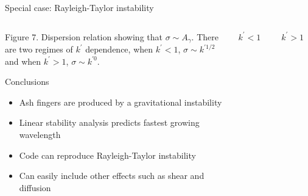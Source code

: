 \documentclass[final]{beamer} %
\begin{document}
\begin{frame}[t]
\begin{block}{Special case: Rayleigh-Taylor instability}
\begin{columns}[t]
\begin{column}{0.3\paperwidth}
        \vspace{-0.8cm}

        \centering \footnotesize Figure 7. Dispersion relation showing that $\sigma \sim A_{\gamma}$. There are two regimes of $k^{\prime}$ dependence, when $k^{\prime} < 1$, $\sigma \sim k^{\prime 1/2}$ and when $k^{\prime} > 1$, $\sigma \sim k^{\prime 0}$. 

        \normalsize
        
        \begin{block}{Conclusions}
          \begin{itemize}
          \item Ash fingers are produced by a gravitational instability \\
          \item Linear stability analysis predicts fastest growing wavelength \\
          \item Code can reproduce Rayleigh-Taylor instability
          \item Can easily include other effects such as shear and diffusion \\
          \end{itemize}
        \end{block}

      \end{column}

      \begin{column}{0.3\paperwidth}

        \vspace{1cm}
        
        \begin{columns}[c]
          
          \begin{column}{0.15\paperwidth}

            \centering $k^{\prime} < 1 \quad (\lambda > 2 \pi L_{\text{p}})$

          \end{column}

          \begin{column}{0.15\paperwidth}

            \centering $k^{\prime} > 1 \quad (\lambda < 2 \pi L_{\text{p}})$

          \end{column}
        \end{columns}

        \vspace{1cm}


\end{column}
\end{columns}
\end{block}
\end{frame}
\end{document}

